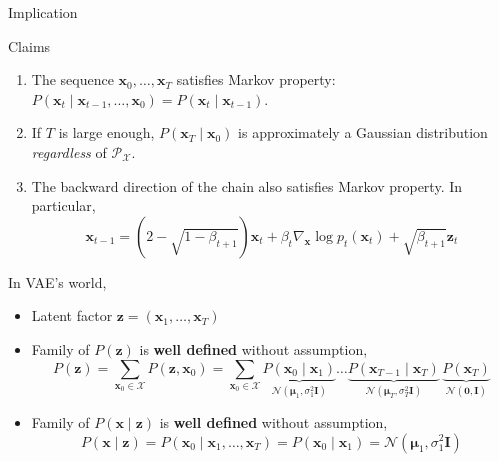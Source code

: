 \documentclass[10pt,xcolor={usenames,dvipsnames,table},aspectratio=169]{beamer}
\begin{document}
\begin{frame}{Implication}
    \begin{block}{Claims}
        \begin{enumerate}
            \item The sequence $\bm{x}_0, \ldots , \bm{x}_T$ satisfies Markov property: $P(\bm{x}_t \mid \bm{x}_{t-1}, \ldots , \bm{x}_0) = P(\bm{x}_t \mid \bm{x}_{t-1})$.
            \item If $T$ is large enough, $P(\bm{x}_T \mid \bm{x}_0)$ is approximately a Gaussian distribution \textit{regardless} of $\mathcal{P}_{\mathcal{X}}$.
            \item The backward direction of the chain also satisfies Markov property. In particular,
                \[
                \bm{x}_{t-1} = \left( 2- \sqrt{1 - \beta_{t+1}} \right) \bm{x}_t + \beta_t \nabla_{\bm{x}} \log p_t(\bm{x}_t) + \sqrt{\beta_{t+1}} \bm{z}_t
                \] 
        \end{enumerate}
    \end{block}

    In VAE's world,
    \begin{itemize}
        \item Latent factor $\bm{z} = (\bm{x}_1, \ldots , \bm{x}_T)$
        \item Family of $P(\bm{z})$ is \textbf{well defined} without assumption,
            \[
            P(\bm{z}) 
            = \sum_{\bm{x}_0 \in \mathcal{X}} P(\bm{z}, \bm{x}_0) 
            = \sum_{\bm{x}_0 \in \mathcal{X}} \underbrace{P(\bm{x}_0 \mid \bm{x}_1)}_{\mathcal{N}(\boldsymbol \mu_1, \sigma_1^2 \bm{I})} \ldots \underbrace{P(\bm{x}_{T-1} \mid \bm{x}_T)}_{\mathcal{N}(\boldsymbol \mu_T, \sigma_T^2 \bm{I})} \, \underbrace{P(\bm{x}_T)}_{\mathcal{N}(\bm{0}, \bm{I})}
            \] 
        \item Family of $P(\bm{x} \mid \bm{z})$ is \textbf{well defined} without assumption,
        \[
        P(\bm{x} \mid \bm{z}) = P(\bm{x}_0 \mid \bm{x}_1, \ldots , \bm{x}_T) = P(\bm{x}_0 \mid \bm{x}_1)= \mathcal{N}(\boldsymbol \mu_1, \sigma_1^2 \bm{I})
        \] 
    \end{itemize}
\end{frame}
\end{document}

